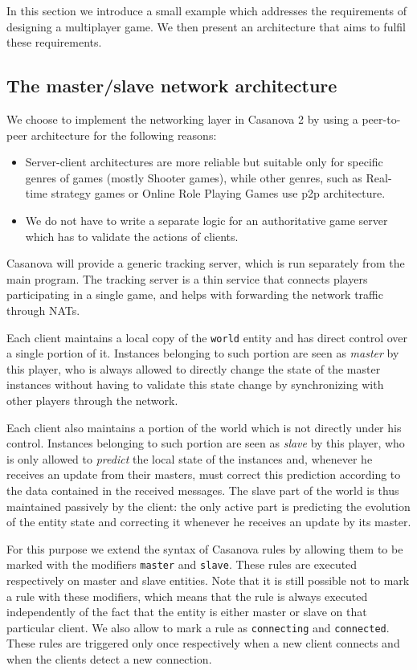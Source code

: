 In this section we introduce a small example which addresses the requirements of designing a multiplayer game. We then present an architecture that aims to fulfil these requirements.

\subsection{The master/slave network architecture}

We choose to implement the networking layer in Casanova 2 by using a peer-to-peer architecture for the following reasons:

\begin{itemize}
	\item Server-client architectures are more reliable but suitable only for specific genres of games (mostly Shooter games), while other genres, such as Real-time strategy games or Online Role Playing Games use p2p architecture.
	\item We do not have to write a separate logic for an authoritative game server which has to validate the actions of clients.
\end{itemize}

Casanova will provide a generic tracking server, which is run separately from the main program. The tracking server is a thin service that connects players participating in a single game, and helps with forwarding the network traffic through NATs.

Each client maintains a local copy of the \texttt{world} entity and has direct control over a single portion of it. Instances belonging to such portion are seen as \textit{master} by this player, who is always allowed to directly change the state of the master instances without having to validate this state change by synchronizing with other players through the network.

Each client also maintains a portion of the world which is not directly under his control. Instances belonging to such portion are seen as \textit{slave} by this player, who is only allowed to \textit{predict} the local state of the instances and, whenever he receives an update from their masters, must correct this prediction according to the data contained in the received messages. The slave part of the world is thus maintained passively by the client: the only active part is predicting the evolution of the entity state and correcting it whenever he receives an update by its master.

For this purpose we extend the syntax of Casanova rules by allowing them to be marked with the modifiers \texttt{master} and \texttt{slave}. These rules are executed respectively on master and slave entities. Note that it is still possible not to mark a rule with these modifiers, which means that the rule is always executed independently of the fact that the entity is either master or slave on that particular client. We also allow to mark a rule as \texttt{connecting} and \texttt{connected}. These rules are triggered only once respectively when a new client connects and when the clients detect a new connection.

